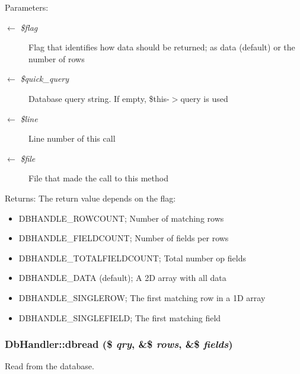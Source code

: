 \begin{Desc}
\item[Parameters:]
\begin{description}
\item[\mbox{$\leftarrow$} {\em \$flag}]Flag that identifies how data should be returned; as data (default) or the number of rows \item[\mbox{$\leftarrow$} {\em \$quick\_\-query}]Database query string. If empty, \$this-$>$query is used \item[\mbox{$\leftarrow$} {\em \$line}]Line number of this call \item[\mbox{$\leftarrow$} {\em \$file}]File that made the call to this method \end{description}
\end{Desc}
\begin{Desc}
\item[Returns:]The return value depends on the flag:\begin{itemize}
\item DBHANDLE\_\-ROWCOUNT; Number of matching rows\item DBHANDLE\_\-FIELDCOUNT; Number of fields per rows\item DBHANDLE\_\-TOTALFIELDCOUNT; Total number op fields\item DBHANDLE\_\-DATA (default); A 2D array with all data\item DBHANDLE\_\-SINGLEROW; The first matching row in a 1D array\item DBHANDLE\_\-SINGLEFIELD; The first matching field \end{itemize}
\end{Desc}
\hypertarget{classDbHandler_130e49aa639fecb46ce6719ddcb0d72f}{
\subsubsection{\setlength{\rightskip}{0pt plus 5cm}DbHandler::dbread (\$ {\em qry}, \&\$ {\em rows}, \&\$ {\em fields})}}
\label{classDbHandler_130e49aa639fecb46ce6719ddcb0d72f}


Read from the database.

